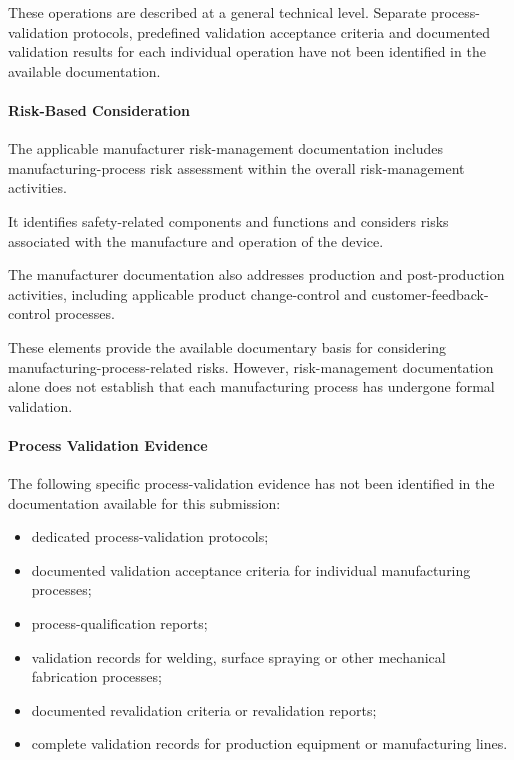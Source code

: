 These operations are described at a general technical level.
Separate process-validation protocols, predefined validation
acceptance criteria and documented validation results for each
individual operation have not been identified in the available
documentation.


\paragraph{Risk-Based Consideration}

The applicable manufacturer risk-management documentation includes
manufacturing-process risk assessment within the overall
risk-management activities.

It identifies safety-related components and functions and considers
risks associated with the manufacture and operation of the device.

The manufacturer documentation also addresses production and
post-production activities, including applicable product
change-control and customer-feedback-control processes.

These elements provide the available documentary basis for
considering manufacturing-process-related risks. However,
risk-management documentation alone does not establish that each
manufacturing process has undergone formal validation.


\paragraph{Process Validation Evidence}

The following specific process-validation evidence has not been
identified in the documentation available for this submission:

\begin{itemize}
    \item dedicated process-validation protocols;
    \item documented validation acceptance criteria for individual
    manufacturing processes;
    \item process-qualification reports;
    \item validation records for welding, surface spraying or other
    mechanical fabrication processes;
    \item documented revalidation criteria or revalidation reports;
    \item complete validation records for production equipment or
    manufacturing lines.
\end{itemize}

